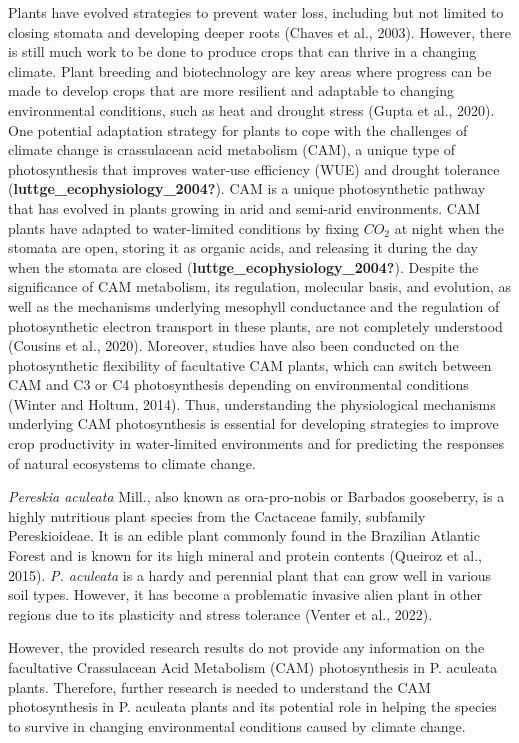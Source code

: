 \documentclass[
  12pt,
  letterpaper,
  DIV=11,
  numbers=noendperiod]{scrartcl}
\begin{document}
Plants have evolved strategies to prevent water loss, including but not
limited to closing stomata and developing deeper roots (Chaves et al.,
2003). However, there is still much work to be done to produce crops
that can thrive in a changing climate. Plant breeding and biotechnology
are key areas where progress can be made to develop crops that are more
resilient and adaptable to changing environmental conditions, such as
heat and drought stress (Gupta et al., 2020). One potential adaptation
strategy for plants to cope with the challenges of climate change is
crassulacean acid metabolism (CAM), a unique type of photosynthesis that
improves water-use efficiency (WUE) and drought tolerance
(\textbf{luttge\_ecophysiology\_2004?}). CAM is a unique photosynthetic
pathway that has evolved in plants growing in arid and semi-arid
environments. CAM plants have adapted to water-limited conditions by
fixing \(CO_2\) at night when the stomata are open, storing it as
organic acids, and releasing it during the day when the stomata are
closed (\textbf{luttge\_ecophysiology\_2004?}). Despite the significance
of CAM metabolism, its regulation, molecular basis, and evolution, as
well as the mechanisms underlying mesophyll conductance and the
regulation of photosynthetic electron transport in these plants, are not
completely understood (Cousins et al., 2020). Moreover, studies have
also been conducted on the photosynthetic flexibility of facultative CAM
plants, which can switch between CAM and C3 or C4 photosynthesis
depending on environmental conditions (Winter and Holtum, 2014). Thus,
understanding the physiological mechanisms underlying CAM photosynthesis
is essential for developing strategies to improve crop productivity in
water-limited environments and for predicting the responses of natural
ecosystems to climate change.

\emph{Pereskia aculeata} Mill., also known as ora-pro-nobis or Barbados
gooseberry, is a highly nutritious plant species from the Cactaceae
family, subfamily Pereskioideae. It is an edible plant commonly found in
the Brazilian Atlantic Forest and is known for its high mineral and
protein contents (Queiroz et al., 2015). \emph{P. aculeata} is a hardy
and perennial plant that can grow well in various soil types. However,
it has become a problematic invasive alien plant in other regions due to
its plasticity and stress tolerance (Venter et al., 2022).

However, the provided research results do not provide any information on
the facultative Crassulacean Acid Metabolism (CAM) photosynthesis in P.
aculeata plants. Therefore, further research is needed to understand the
CAM photosynthesis in P. aculeata plants and its potential role in
helping the species to survive in changing environmental conditions
caused by climate change.
\end{document}
